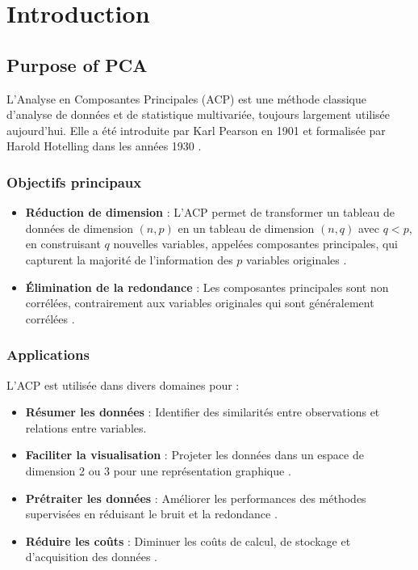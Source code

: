 \documentclass[10pt,a4paper]{article}
\title{}
\date{}
\begin{document}
\section*{Introduction}

\subsection*{Purpose of PCA}
L'Analyse en Composantes Principales (ACP) est une méthode classique d'analyse de données et de statistique multivariée, toujours largement utilisée aujourd'hui. Elle a été introduite par Karl Pearson en 1901 et formalisée par Harold Hotelling dans les années 1930 \cite{wiki_pca}.

\subsubsection*{Objectifs principaux}
\begin{itemize}
    \item \textbf{Réduction de dimension} : L'ACP permet de transformer un tableau de données de dimension $(n, p)$ en un tableau de dimension $(n, q)$ avec $q < p$, en construisant $q$ nouvelles variables, appelées composantes principales, qui capturent la majorité de l'information des $p$ variables originales \cite{builtin_pca}.
    \item \textbf{Élimination de la redondance} : Les composantes principales sont non corrélées, contrairement aux variables originales qui sont généralement corrélées \cite{geeks_pca}.
\end{itemize}

\subsubsection*{Applications}
L'ACP est utilisée dans divers domaines pour :
\begin{itemize}
    \item \textbf{Résumer les données} : Identifier des similarités entre observations et relations entre variables.
    \item \textbf{Faciliter la visualisation} : Projeter les données dans un espace de dimension 2 ou 3 pour une représentation graphique \cite{builtin_pca}.
    \item \textbf{Prétraiter les données} : Améliorer les performances des méthodes supervisées en réduisant le bruit et la redondance \cite{pmc_pca}.
    \item \textbf{Réduire les coûts} : Diminuer les coûts de calcul, de stockage et d'acquisition des données \cite{builtin_pca}.
\end{itemize}
\end{document}
